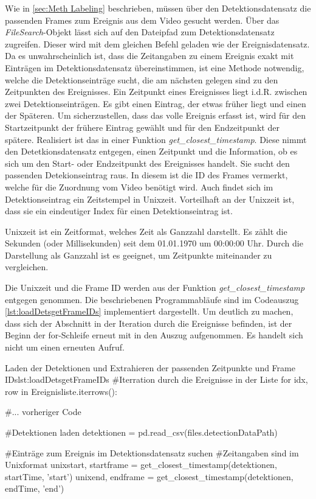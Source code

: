 Wie in \autoref{sec:Meth Labeling} beschrieben, müssen über den Detektionsdatensatz die passenden Frames zum Ereignis aus dem Video gesucht werden. Über das \textit{FileSearch}-Objekt lässt sich auf den Dateipfad zum Detektionsdatensatz zugreifen. Dieser wird mit dem gleichen Befehl geladen wie der Ereignisdatensatz. Da es unwahrscheinlich ist, dass die Zeitangaben zu einem Ereignis exakt mit Einträgen im Detektionsdatensatz übereinstimmen, ist eine Methode notwendig, welche die Detektionseinträge sucht, die am nächsten gelegen sind zu den Zeitpunkten des Ereignisses. Ein Zeitpunkt eines Ereignisses liegt i.d.R. zwischen zwei Detektionseinträgen. Es gibt einen Eintrag, der etwas früher liegt und einen der Späteren. Um sicherzustellen, dass das volle Ereignis erfasst ist, wird für den Startzeitpunkt der frühere Eintrag gewählt und für den Endzeitpunkt der spätere. Realisiert ist das in einer Funktion \textit{get\_closest\_timestamp}. Diese nimmt den Detetkionsdatensatz entgegen, einen Zeitpunkt und die Information, ob es sich um den Start- oder Endzeitpunkt des Ereignisses handelt. Sie sucht den passenden Detekionseintrag raus. In diesem ist die ID des Frames vermerkt, welche für die Zuordnung vom Video benötigt wird. Auch findet sich im Detektionseintrag ein Zeitstempel in Unixzeit. Vorteilhaft an der Unixzeit ist, dass sie ein eindeutiger Index für einen Detektionseintrag ist. \par

Unixzeit ist ein Zeitformat, welches Zeit als Ganzzahl darstellt. Es zählt die Sekunden (oder Millisekunden) seit dem 01.01.1970 um 00:00:00 Uhr. Durch die Darstellung als Ganzzahl ist es geeignet, um Zeitpunkte miteinander zu vergleichen.  \par

Die Unixzeit und die Frame ID werden aus der Funktion \textit{get\_closest\_timestamp} entgegen genommen. Die beschriebenen Programmabläufe sind im Codeauszug \ref{lst:loadDetsgetFrameIDs} implementiert dargestellt. Um deutlich zu machen, dass sich der Abschnitt in der Iteration durch die Ereignisse befinden, ist der Beginn der for-Schleife erneut mit in den Auszug aufgenommen. Es handelt sich nicht um einen erneuten Aufruf.

\begin{pythoncode}{Laden der Detektionen und Extrahieren der passenden Zeitpunkte und Frame IDs}{lst:loadDetsgetFrameIDs}
#Iterration durch die Ereignisse in der Liste
for idx, row in Ereignisliste.iterrows():  

    #... vorheriger Code

    #Detektionen laden
    detektionen = pd.read_csv(files.detectionDataPath)

    #Einträge zum Ereignis im Detektionsdatensatz suchen
    #Zeitangaben sind im Unixformat
    unixstart, startframe = get_closest_timestamp(detektionen, startTime, 'start') 
    unixend, endframe = get_closest_timestamp(detektionen, endTime, 'end')
\end{pythoncode}

